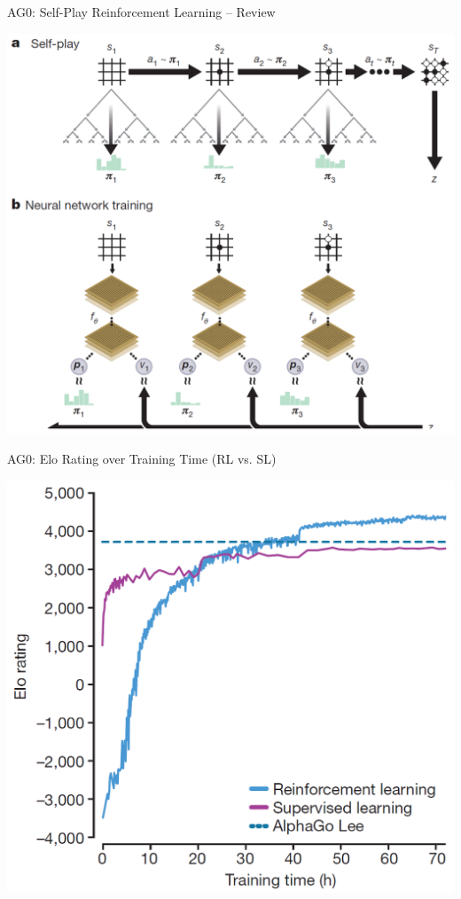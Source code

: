 \documentclass{beamer}
\begin{document}
{    \begin{frame}{AG0: Self-Play Reinforcement Learning -- Review}
      \begin{center}
        \includegraphics[height=.9\textheight]{../img/AG0-paper/self-play-RL-in-AG0.png}
      \end{center}
    \end{frame}

    \begin{frame}{AG0: Elo Rating over Training Time (RL vs. SL)}
      \begin{center}
        \includegraphics[height=.9\textheight]{../img/AG0-paper/training-time-vs-elo.png}
      \end{center}
    \end{frame}

}
\end{document}
